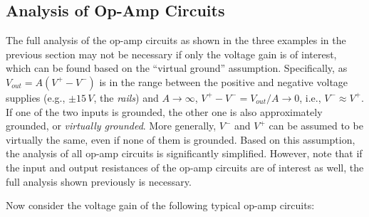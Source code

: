 \documentclass{article}
\begin{document}
\subsection*{Analysis of Op-Amp Circuits}


The full analysis of the op-amp circuits as shown in the three examples
in the previous section may not be necessary if only the voltage gain is 
of interest, which can be found based on the ``virtual ground'' assumption.
Specifically, as $V_{out}=A(V^+-V^-)$ is in the range between the positive 
and negative voltage supplies (e.g., $\pm 15\,V$, the {\em rails}) and 
$A\rightarrow\infty$, $V^+-V^-=V_{out}/A\rightarrow 0$, i.e., $V^-\approx V^+$. 
If one of the two inputs is grounded, the other one is also approximately 
grounded, or {\em virtually grounded}. More generally, $V^-$ and $V^+$ can
be assumed to be virtually the same, even if none of them is grounded. Based
on this assumption, the analysis of all op-amp circuits is significantly 
simplified. However, note that if the input and output resistances of the 
op-amp circuits are of interest as well, the full analysis shown previously 
is necessary.

Now consider the voltage gain of the following typical op-amp circuits:
\end{document}
